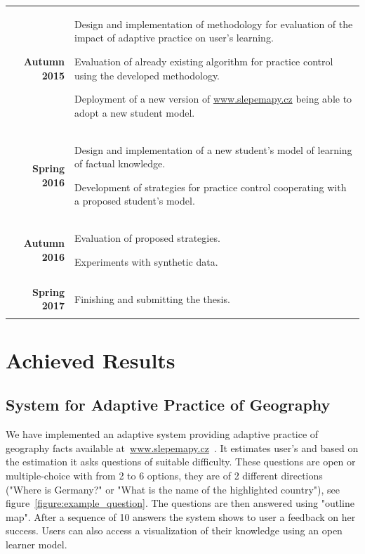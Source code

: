 \documentclass[table,color,cover,twoside,nolot,nolof]{fithesis3/fithesis3}
\begin{document}
\begin{tabularx}{\textwidth}{rX}
	\rowcolor{white}
	\textbf{Autumn 2015} &
		\begin{enumerate*}
			\item Design and implementation of methodology for evaluation of the impact
				of adaptive practice on user's learning.
			\item Evaluation of already existing algorithm for practice control using the
				developed methodology.
			\item Deployment of a new version of \url{www.slepemapy.cz}
				being able to adopt a new student model.
		\end{enumerate*}\\
	\rowcolor{white}
	\textbf{Spring 2016} &
		\begin{enumerate*}
			\item Design and implementation of a new student's model of learning of
				factual knowledge.
			\item Development of strategies for practice control cooperating with a
				proposed student's model.
		\end{enumerate*}\\
	\rowcolor{white}
	\textbf{Autumn 2016} &
		\begin{enumerate*}
			\item Evaluation of proposed strategies.
			\item Experiments with synthetic data.
		\end{enumerate*}\\
	\rowcolor{white}
	\textbf{Spring 2017} &
		\begin{enumerate*}
			\item Finishing and submitting the thesis.
		\end{enumerate*}
\end{tabularx}

\chapter{Achieved Results}
\label{chapter:achieved_results}

\section{System for Adaptive Practice of Geography}

We have implemented an adaptive system providing adaptive practice of geography
facts available at~\url{www.slepemapy.cz}~\cite{papousek2014adaptive}. It
estimates user's and based on the estimation it asks questions of suitable
difficulty. These questions are open or multiple-choice with from 2 to 6
options, they are of 2 different directions ("Where is Germany?" or "What is
the name of the highlighted country"), see
figure~\ref{figure:example_question}. The questions are then answered using
"outline map". After a sequence of 10 answers the system shows to user a
feedback on her success.  Users can also access a visualization of their
knowledge using an open learner model.
\end{document}
